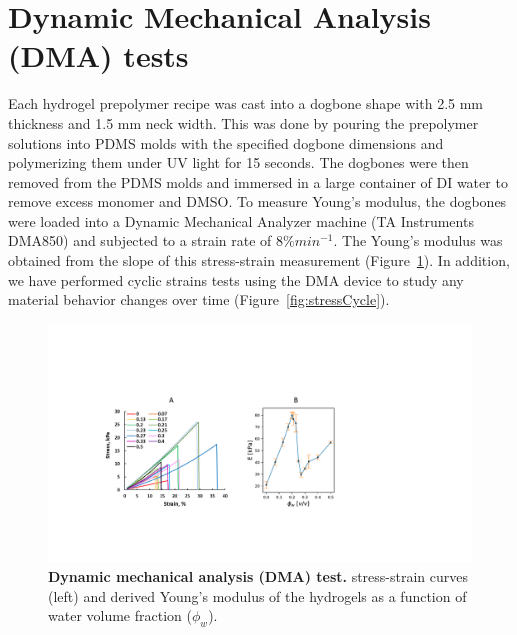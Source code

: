 \section{Dynamic Mechanical Analysis (DMA) tests}
Each hydrogel prepolymer recipe was cast into a dogbone shape with 2.5 mm thickness and 1.5 mm neck width. This was done by pouring the prepolymer solutions into PDMS molds with the specified dogbone dimensions and polymerizing them under UV light for 15 seconds. The dogbones were then removed from the PDMS molds and immersed in a large container of DI water to remove excess monomer and DMSO. To measure Young’s modulus, the dogbones were loaded into a Dynamic Mechanical Analyzer machine (TA Instruments DMA850) and subjected to a strain rate of $8\% min^{-1}$. The Young’s modulus was obtained from the slope of this stress-strain measurement (Figure~\ref{fig:DMA}). In addition, we have performed cyclic strains tests using the DMA device to study any material behavior changes over time (Figure~\ref{fig:stressCycle}).

\begin{figure}[!th]
      \centering
      \includegraphics[width=\textwidth]{DMA.pdf}
      \caption[Dynamic mechanical analysis (DMA)]{\textbf{Dynamic mechanical analysis (DMA) test.} stress-strain curves (left) and derived Young’s modulus of the hydrogels as a function of water volume fraction ($\phi_{w}$).}
      \label{fig:DMA}
\end{figure}

